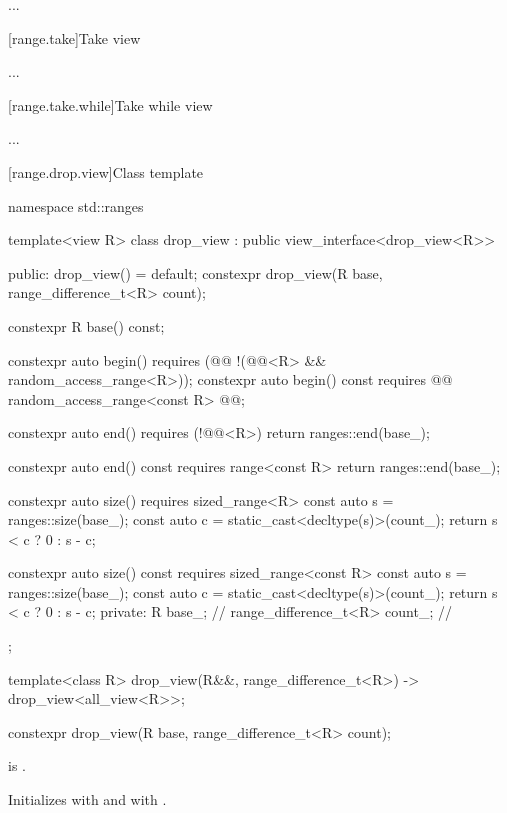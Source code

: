 \documentclass{wg21}
\begin{document}
...

[range.take]{Take view}

...

[range.take.while]{Take while view}

...

[range.drop.view]{Class template }

%
\begin{codeblock}
namespace std::ranges {
	template<view R>
	class drop_view : public view_interface<drop_view<R>> {
		public:
		drop_view() = default;
		constexpr drop_view(R base, range_difference_t<R> count);
		
		constexpr R base() const;
		
		constexpr auto begin()
		requires (@@ !(@@<R> && random_access_range<R>));
		constexpr auto begin() const
		requires @@ random_access_range<const R> @\added{)}@;
		
		constexpr auto end()
		requires (!@@<R>)
		{ return ranges::end(base_); }
		
		constexpr auto end() const
		requires range<const R>
		{ return ranges::end(base_); }
		
		constexpr auto size()
		requires sized_range<R>
		{
			const auto s = ranges::size(base_);
			const auto c = static_cast<decltype(s)>(count_);
			return s < c ? 0 : s - c;
		}
		
		constexpr auto size() const
		requires sized_range<const R>
		{
			const auto s = ranges::size(base_);
			const auto c = static_cast<decltype(s)>(count_);
			return s < c ? 0 : s - c;
		}
		private:
		R base_;                                    // \expos
		range_difference_t<R> count_;               // \expos
	};
	
	template<class R>
	drop_view(R&&, range_difference_t<R>) -> drop_view<all_view<R>>;
}
\end{codeblock}

%
\begin{itemdecl}
constexpr drop_view(R base, range_difference_t<R> count);
\end{itemdecl}

\begin{itemdescr}
\pnum
\expects
{} is .

\pnum
\effects
Initializes  with  and
 with .
\end{itemdescr}
\end{document}
